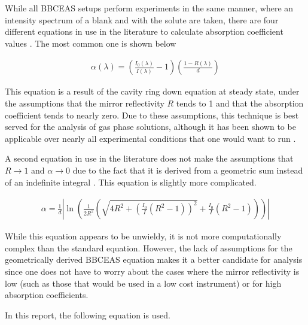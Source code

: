 
While all \ac{BBCEAS} setups perform experiments in the same manner, where an
intensity spectrum of a blank and with the solute are taken, there are four
different equations in use in the literature to calculate absorption
coefficient values \cite{Mazurenka:2005fh}. The most common one is shown below

  \begin{align}
    \alpha(\lambda) = \left(\frac{I_0(\lambda)}{I(\lambda)}-1\right)\left(\frac{1-R(\lambda)}{d}\right)\label{eq:ceas_std}
  \end{align}


This equation is a result of the cavity ring down equation at steady state,
under the assumptions that the mirror reflectivity $R$ tends to 1 and that the
absorption coefficient tends to nearly zero. Due to these assumptions, this
technique is best served for the analysis of gas phase solutions, although it
has been shown to be applicable over nearly all experimental conditions that
one would want to run \cite{Mazurenka:2005fh}.

A second equation in use in the literature does not make the assumptions that
$R \to 1$ and $\alpha \to 0$ due to the fact that it is derived from a
geometric sum instead of an indefinite integral \cite{Fiedler:2003db}. This
equation is slightly more complicated.

  \begin{align}
    \alpha = \frac{1}{d}\left|\ln\left(\frac{1}{2R^2}\left(\sqrt{4R^2+\left(\frac{I_0}{I}(R^2-1)\right)^2} + \frac{I_0}{I}(R^2-1)\right)\right)\right| \label{eq:ceas_geo}
  \end{align}

While this equation appears to be unwieldy, it is not more computationally
complex than the standard equation. However, the lack of assumptions for
the geometrically derived \ac{BBCEAS} equation makes it a better candidate
for analysis since one does not have to worry about the cases where the
mirror reflectivity is low (such as those that would be used in a low cost
instrument) or for high absorption coefficients.

In this report, the following equation is used.



